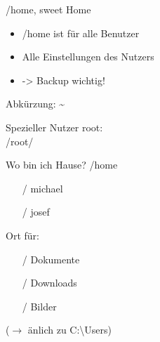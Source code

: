 \begin{frame}{/home, sweet Home}

\begin{itemize}
	\item /home ist für alle Benutzer
	\item Alle Einstellungen des Nutzers
	\item -> Backup wichtig!
\end{itemize}

Abkürzung: \textasciitilde

\vfill

Spezieller Nutzer root:\\
/root/
\vfill

\end{frame}

\begin{frame}{Wo bin ich Hause?}
/home
\begin{itemize}
  \item [/] michael
  \item [/] josef
\end{itemize}
\vfill
Ort für:
\begin{itemize}
 \item [/] Dokumente
 \item [/] Downloads
 \item [/] Bilder
\end{itemize}
\vfill
($\longrightarrow$ änlich zu C:\textbackslash Users)

\vfill
\end{frame}
